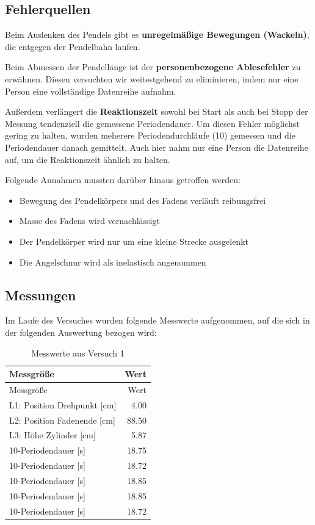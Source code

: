 \documentclass[
  9pt,
]{article}
\providecommand{\tightlist}{%
  \setlength{\itemsep}{0pt}\setlength{\parskip}{0pt}}
\begin{document}
\hypertarget{fehlerquellen}{%
\subsection{Fehlerquellen}\label{fehlerquellen}}

Beim Auslenken des Pendels gibt es \textbf{unregelmäßige Bewegungen
(Wackeln)}, die entgegen der Pendelbahn laufen.

Beim Abmessen der Pendellänge ist der \textbf{personenbezogene
Ablesefehler} zu erwähnen. Diesen versuchten wir weitestgehend zu
eliminieren, indem nur eine Person eine vollständige Datenreihe aufnahm.

Außerdem verlängert die \textbf{Reaktionszeit} sowohl bei Start als auch
bei Stopp der Messung tendenziell die gemessene Periodendauer. Um diesen
Fehler möglichst gering zu halten, wurden meherere Periodendurchläufe
(10) gemessen und die Periodendauer danach gemittelt. Auch hier nahm nur
eine Person die Datenreihe auf, um die Reaktionszeit ähnlich zu halten.

Folgende Annahmen mussten darüber hinaus getroffen werden:

\begin{itemize}
\tightlist
\item
  Bewegung des Pendelkörpers und des Fadens verläuft reibungsfrei
\item
  Masse des Fadens wird vernachlässigt
\item
  Der Pendelkörper wird nur um eine kleine Strecke ausgelenkt
\item
  Die Angelschnur wird als inelastisch angenommen
\end{itemize}

\hypertarget{messungen}{%
\subsection{Messungen}\label{messungen}}

Im Laufe des Versuches wurden folgende Messwerte aufgenommen, auf die
sich in der folgenden Auswertung bezogen wird:

\begin{longtable}[]{@{}lr@{}}
\caption{Messwerte aus Versuch 1}\tabularnewline
\toprule()
Messgröße & Wert \\
\midrule()
\endfirsthead
\toprule()
Messgröße & Wert \\
\midrule()
\endhead
L1: Position Drehpunkt {[}cm{]} & 4.00 \\
L2: Position Fadenende {[}cm{]} & 88.50 \\
L3: Höhe Zylinder {[}cm{]} & 5.87 \\
10-Periodendauer {[}s{]} & 18.75 \\
10-Periodendauer {[}s{]} & 18.72 \\
10-Periodendauer {[}s{]} & 18.85 \\
10-Periodendauer {[}s{]} & 18.85 \\
10-Periodendauer {[}s{]} & 18.72 \\
\bottomrule()
\end{longtable}
\end{document}
